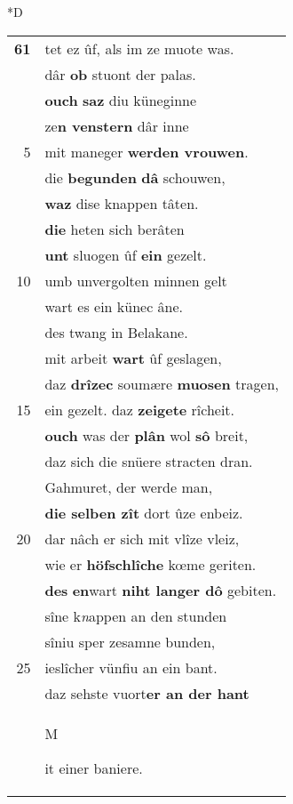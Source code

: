 \documentclass[8pt,a4paper,notitlepage]{article}
\begin{document}
\begin{table}[ht]
\begin{minipage}[t]{0.5\linewidth}
\small
\begin{center}*D
\end{center}
\begin{tabular}{rl}
\textbf{61} & tet ez ûf, als im ze muote was.\\ 
 & dâr \textbf{ob} stuont der palas.\\ 
 & \textbf{ouch} \textbf{saz} diu küneginne\\ 
 & ze\textbf{n venstern} dâr inne\\ 
5 & mit maneger \textbf{werden vrouwen}.\\ 
 & die \textbf{begunden} \textbf{dâ} schouwen,\\ 
 & \textbf{waz} dise knappen tâten.\\ 
 & \textbf{die} heten sich berâten\\ 
 & \textbf{unt} sluogen ûf \textbf{ein} gezelt.\\ 
10 & umb unvergolten minnen gelt\\ 
 & wart es ein künec âne.\\ 
 & des twang in Belakane.\\ 
 & mit arbeit \textbf{wart} ûf geslagen,\\ 
 & daz \textbf{drîzec} soumære \textbf{muosen} tragen,\\ 
15 & ein gezelt. daz \textbf{zeigete} rîcheit.\\ 
 & \textbf{ouch} was der \textbf{plân} wol \textbf{sô} breit,\\ 
 & daz sich die snüere stracten dran.\\ 
 & Gahmuret, der werde man,\\ 
 & \textbf{die selben zît} dort ûze enbeiz.\\ 
20 & dar nâch er sich mit vlîze vleiz,\\ 
 & wie er \textbf{höfschlîche} kœme geriten.\\ 
 & \textbf{des} \textbf{en}wart \textbf{niht langer dô} gebiten.\\ 
 & sîne k\textit{n}appen an den stunden\\ 
 & sîniu sper zesamne bunden,\\ 
25 & ieslîcher vünfiu an ein bant.\\ 
 & daz sehste vuort\textbf{er an der hant}\\ 
 & \begin{large}M\end{large}it einer baniere.\\ 

\end{tabular}
\end{minipage}
\end{table}
\end{document}
